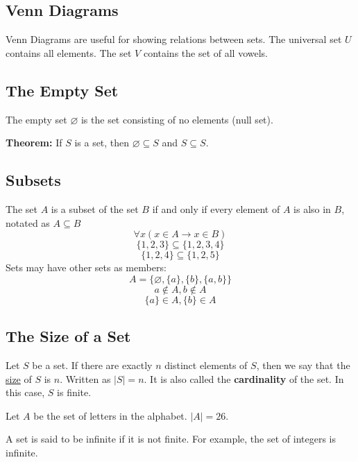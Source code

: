 \documentclass{math}
\begin{document}
\subsection*{Venn Diagrams}
Venn Diagrams are useful for showing relations between sets. The universal
set \( U \) contains all elements. The set \( V \) contains the set of all
vowels.
\begin{center}
\end{center}

\subsection*{The Empty Set}
The empty set \( \varnothing \) is the set consisting of no elements (null set).
\par
\textbf{Theorem:} If \( S \) is a set, then \( \varnothing \subseteq S \) and
\( S \subseteq S \).

\subsection*{Subsets}
The set \( A \) is a subset of the set \( B \) if and only if every element of
\( A \) is also in \( B \), notated as \( A \subseteq B \)
\[ \forall{x}(x \in A \to x \in B) \]
\[ \bigg\{1,2,3\bigg\} \subseteq \bigg\{1,2,3,4\bigg\} \]
\[ \bigg\{1,2,4\bigg\} \subseteq \bigg\{1,2,5\bigg\} \]
Sets may have other sets as members:
\[ A = \{\varnothing, \{a\}, \{b\}, \{a,b\}\} \]
\[ a \notin A, b \notin A \]
\[ \{a\} \in A, \{b\} \in A \]

\subsection*{The Size of a Set}
Let \( S \) be a set. If there are exactly \( n \) distinct elements of \( S \),
then we say that the \underline{size} of \( S \) is \( n \). Written as
\( |S| = n \). It is also called the \textbf{cardinality} of the set. In this
case, \( S \) is finite. \par
Let \( A \) be the set of letters in the alphabet. \( |A| = 26 \). \par
A set is said to be infinite if it is not finite. For example, the set of
integers is infinite.
\end{document}
